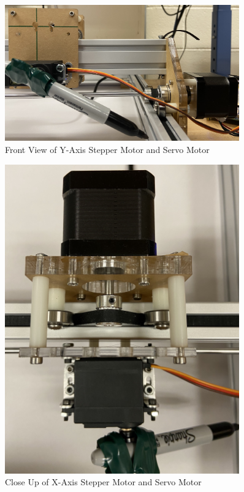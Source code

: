 \documentclass[12pt]{article}
\begin{document}
\begin{figure}[ht!]
\begin{center}
\includegraphics[width=0.9\textwidth]{IMG_0471.jpg}
\end{center}
\caption{Front View of Y-Axis Stepper Motor and Servo Motor}
\end{figure}

\begin{figure}[ht!]
\begin{center}
\includegraphics[width=0.9\textwidth]{IMG_0470.jpg}
\end{center}
\caption{Close Up of X-Axis Stepper Motor and Servo Motor}
\end{figure}
\end{document}
